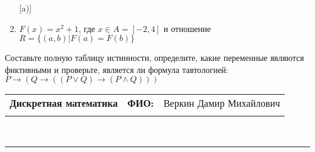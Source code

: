 \documentclass[10pt]{exam}
\newcommand{\class}{Дискретная математика}
\newcommand{\examdate}{}
\begin{document}
\begin{questions}
\begin{enumerate} [a)]
\item $F(x)=x^{2}+1$, где $x \in A = [-2, 4]$ и отношение $R = \{(a,b)|F(a) = F(b)\}$
\end{enumerate}\question Составьте полную таблицу истинности, определите, какие переменные являются фиктивными и проверьте, является ли формула тавтологией:
$ P \rightarrow (Q \rightarrow ((P \lor Q) \rightarrow (P \land Q)))$

\end{questions}
\newpage
\begin{flushright}
\begin{tabular}{p{2.8in} r l}
\textbf{\class} & \textbf{ФИО:} &Веркин Дамир Михайлович
\\

\textbf{\examdate} &&\\
\end{tabular}\\
\end{flushright}
\rule[1ex]{\textwidth}{.1pt}
\end{document}

